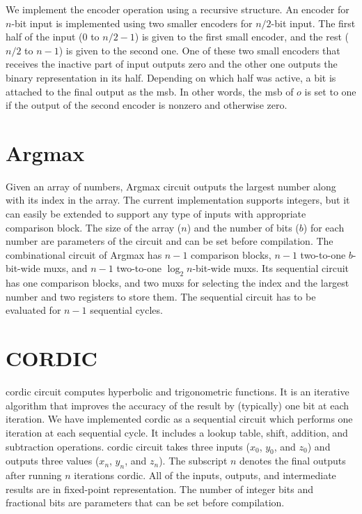 We implement the encoder operation using a recursive structure.
An encoder for $n$-bit input is implemented using two smaller encoders for $n/2$-bit input.
The first half of the input ($0$ to $n/2-1$) is given to the first small encoder, and the rest ($n/2$ to $n-1$) is given to the second one.
One of these two small encoders that receives the inactive part of input outputs zero and the other one outputs the binary representation in its half.
Depending on which half was active, a bit is attached to the final output as the \acrfull{msb}.
In other words, the \acrshort{msb} of $o$ is set to one if the output of the second encoder is nonzero and otherwise zero.

\section{Argmax}
Given an array of numbers, Argmax circuit outputs the largest number along with its index in the array.
The current implementation supports integers, but it can easily be extended to support any type of inputs with appropriate comparison block.
The size of the array ($n$) and the number of bits ($b$) for each number are parameters of the circuit and can be set before compilation.
The combinational circuit of Argmax has $n-1$ comparison blocks, $n-1$ two-to-one $b$-bit-wide \acrfull{mux}s, and $n-1$ two-to-one $\log_2{n}$-bit-wide \acrshort{mux}s.
Its sequential circuit has one comparison blocks, and two \acrshort{mux}s for selecting the index and the largest number and two registers to store them.
The sequential circuit has to be evaluated for $n-1$ sequential cycles.

\section{CORDIC}
\acrfull{cordic} circuit computes hyperbolic and trigonometric functions.
It is an iterative algorithm that improves the accuracy of the result by (typically) one bit at each iteration.
We have implemented \acrshort{cordic} as a sequential circuit which performs one iteration at each sequential cycle.
It includes a lookup table, shift, addition, and subtraction operations.
\acrshort{cordic} circuit takes three inputs ($x_0$, $y_0$, and $z_0$) and outputs three values ($x_n$, $y_n$, and $z_n$).
The subscript $n$ denotes the final outputs after running $n$ iterations \acrshort{cordic}.
All of the inputs, outputs, and intermediate results are in fixed-point representation.
The number of integer bits and fractional bits are parameters that can be set before compilation.

